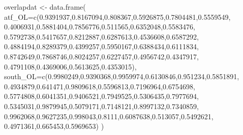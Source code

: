 \documentclass[
]{article}
\newenvironment{Shaded}{\begin{snugshade}}{\end{snugshade}}
\newcommand{\AttributeTok}[1]{\textcolor[rgb]{0.77,0.63,0.00}{#1}}
\newcommand{\FloatTok}[1]{\textcolor[rgb]{0.00,0.00,0.81}{#1}}
\newcommand{\FunctionTok}[1]{\textcolor[rgb]{0.00,0.00,0.00}{#1}}
\newcommand{\NormalTok}[1]{#1}
\newcommand{\OtherTok}[1]{\textcolor[rgb]{0.56,0.35,0.01}{#1}}
\begin{document}
\begin{Shaded}
\begin{Highlighting}[]
\NormalTok{                overlapdat }\OtherTok{\textless{}{-}} \FunctionTok{data.frame}\NormalTok{(}
                    \AttributeTok{atf\_OL=}\FunctionTok{c}\NormalTok{(}\FloatTok{0.9391937}\NormalTok{,}\FloatTok{0.8167094}\NormalTok{,}\FloatTok{0.808367}\NormalTok{,}\FloatTok{0.5926875}\NormalTok{,}\FloatTok{0.7804481}\NormalTok{,}\FloatTok{0.5559549}\NormalTok{,}
                             \FloatTok{0.4006931}\NormalTok{,}\FloatTok{0.5881404}\NormalTok{,}\FloatTok{0.7856776}\NormalTok{,}\FloatTok{0.511565}\NormalTok{,}\FloatTok{0.6352048}\NormalTok{,}\FloatTok{0.5583476}\NormalTok{,}
                             \FloatTok{0.5792738}\NormalTok{,}\FloatTok{0.5417657}\NormalTok{,}\FloatTok{0.8212887}\NormalTok{,}\FloatTok{0.6287613}\NormalTok{,}\FloatTok{0.4536608}\NormalTok{,}\FloatTok{0.6587292}\NormalTok{,}
                             \FloatTok{0.4884194}\NormalTok{,}\FloatTok{0.8289379}\NormalTok{,}\FloatTok{0.4399257}\NormalTok{,}\FloatTok{0.5950167}\NormalTok{,}\FloatTok{0.6388434}\NormalTok{,}\FloatTok{0.6111834}\NormalTok{,}
                             \FloatTok{0.8742649}\NormalTok{,}\FloatTok{0.7868746}\NormalTok{,}\FloatTok{0.8024257}\NormalTok{,}\FloatTok{0.6227457}\NormalTok{,}\FloatTok{0.4956742}\NormalTok{,}\FloatTok{0.4347917}\NormalTok{,}
                             \FloatTok{0.4791108}\NormalTok{,}\FloatTok{0.4369006}\NormalTok{,}\FloatTok{0.5613625}\NormalTok{,}\FloatTok{0.4353015}\NormalTok{),}
                    \AttributeTok{south\_OL=}\FunctionTok{c}\NormalTok{(}\FloatTok{0.9980249}\NormalTok{,}\FloatTok{0.9390368}\NormalTok{,}\FloatTok{0.9959974}\NormalTok{,}\FloatTok{0.6130846}\NormalTok{,}\FloatTok{0.951234}\NormalTok{,}\FloatTok{0.5851891}\NormalTok{,}
                               \FloatTok{0.4934879}\NormalTok{,}\FloatTok{0.641471}\NormalTok{,}\FloatTok{0.9809618}\NormalTok{,}\FloatTok{0.5596813}\NormalTok{,}\FloatTok{0.7196964}\NormalTok{,}\FloatTok{0.6754698}\NormalTok{,}
                               \FloatTok{0.5774808}\NormalTok{,}\FloatTok{0.6041351}\NormalTok{,}\FloatTok{0.9406521}\NormalTok{,}\FloatTok{0.7949525}\NormalTok{,}\FloatTok{0.5306435}\NormalTok{,}\FloatTok{0.7977694}\NormalTok{,}
                               \FloatTok{0.5345031}\NormalTok{,}\FloatTok{0.9879945}\NormalTok{,}\FloatTok{0.5079171}\NormalTok{,}\FloatTok{0.7148121}\NormalTok{,}\FloatTok{0.8997132}\NormalTok{,}\FloatTok{0.7340859}\NormalTok{,}
                               \FloatTok{0.9962068}\NormalTok{,}\FloatTok{0.9627235}\NormalTok{,}\FloatTok{0.998043}\NormalTok{,}\FloatTok{0.8111}\NormalTok{,}\FloatTok{0.6087638}\NormalTok{,}\FloatTok{0.513057}\NormalTok{,}\FloatTok{0.5492621}\NormalTok{,}
                               \FloatTok{0.4971361}\NormalTok{,}\FloatTok{0.665453}\NormalTok{,}\FloatTok{0.5969653}\NormalTok{)}
\NormalTok{                    )}
          

\end{Highlighting}
\end{Shaded}
\end{document}
